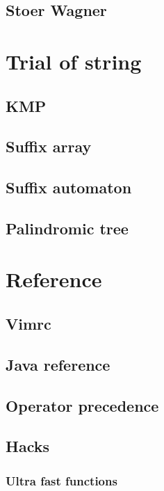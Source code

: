 \documentclass[UTF8,a4paper]{report}
\begin{document}
		\section{Stoer Wagner}
			
	\chapter{Trial of string}
		\section{KMP}
			
		\section{Suffix array}
			
		\section{Suffix automaton}
			
		\section{Palindromic tree}
			
	\chapter{Reference}
		\section{Vimrc}
			
		\section{Java reference}
			
		\section{Operator precedence}
			
		\section{Hacks}
			\subsection{Ultra fast functions}
				
\end{document}
